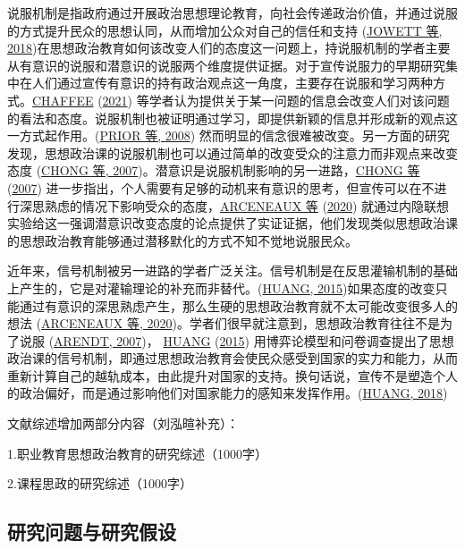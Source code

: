 \documentclass[
  12pt,
]{ctexart}
\begin{document}
说服机制是指政府通过开展政治思想理论教育，向社会传递政治价值，并通过说服的方式提升民众的思想认同，从而增加公众对自己的信任和支持 (\protect\hyperlink{ref-JowettODonnell2018}{JOWETT 等, 2018})在思想政治教育如何该改变人们的态度这一问题上，持说服机制的学者主要从有意识的说服和潜意识的说服两个维度提供证据。对于宣传说服力的早期研究集中在人们通过宣传有意识的持有政治观点这一角度，主要存在说服和学习两种方式。\protect\hyperlink{ref-Chaffee2021}{CHAFFEE} (\protect\hyperlink{ref-Chaffee2021}{2021}) 等学者认为提供关于某一问题的信息会改变人们对该问题的看法和态度。说服机制也被证明通过学习，即提供新颖的信息并形成新的观点这一方式起作用。(\protect\hyperlink{ref-PriorLupia2008}{PRIOR 等, 2008}) 然而明显的信念很难被改变。另一方面的研究发现，思想政治课的说服机制也可以通过简单的改变受众的注意力而非观点来改变态度 (\protect\hyperlink{ref-ChongDruckman2007}{CHONG 等, 2007})。潜意识是说服机制影响的另一进路，\protect\hyperlink{ref-ChongDruckman2007}{CHONG 等} (\protect\hyperlink{ref-ChongDruckman2007}{2007}) 进一步指出，个人需要有足够的动机来有意识的思考，但宣传可以在不进行深思熟虑的情况下影响受众的态度，\protect\hyperlink{ref-ArceneauxTruex2020}{ARCENEAUX 等} (\protect\hyperlink{ref-ArceneauxTruex2020}{2020}) 就通过内隐联想实验给这一强调潜意识改变态度的论点提供了实证证据，他们发现类似思想政治课的思想政治教育能够通过潜移默化的方式不知不觉地说服民众。

近年来，信号机制被另一进路的学者广泛关注。信号机制是在反思灌输机制的基础上产生的，它是对灌输理论的补充而非替代。(\protect\hyperlink{ref-Huang2015a}{HUANG, 2015})如果态度的改变只能通过有意识的深思熟虑产生，那么生硬的思想政治教育就不太可能改变很多人的想法 (\protect\hyperlink{ref-ArceneauxTruex2020}{ARCENEAUX 等, 2020})。学者们很早就注意到，思想政治教育往往不是为了说服 (\protect\hyperlink{ref-Arendt2007}{ARENDT, 2007})， \protect\hyperlink{ref-Huang2015a}{HUANG} (\protect\hyperlink{ref-Huang2015a}{2015}) 用博弈论模型和问卷调查提出了思想政治课的信号机制，即通过思想政治教育会使民众感受到国家的实力和能力，从而重新计算自己的越轨成本，由此提升对国家的支持。换句话说，宣传不是塑造个人的政治偏好，而是通过影响他们对国家能力的感知来发挥作用。(\protect\hyperlink{ref-Huang2018}{HUANG, 2018})

文献综述增加两部分内容（刘泓暄补充）：

1.职业教育思想政治教育的研究综述（1000字）

2.课程思政的研究综述（1000字）

\hypertarget{ux7814ux7a76ux95eeux9898ux4e0eux7814ux7a76ux5047ux8bbe}{%
\subsection{研究问题与研究假设}\label{ux7814ux7a76ux95eeux9898ux4e0eux7814ux7a76ux5047ux8bbe}}
\end{document}
